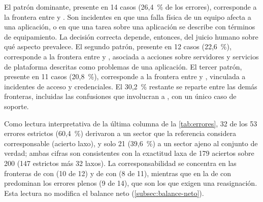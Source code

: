 El patrón dominante, presente en 14 casos (26,4~\% de los errores), corresponde a la frontera entre  y . Son incidentes en que una falla física de un equipo afecta a una aplicación, o en que una tarea sobre una aplicación se describe con términos de equipamiento. La decisión correcta depende, entonces, del juicio humano sobre qué aspecto prevalece. El segundo patrón, presente en 12 casos (22,6~\%), corresponde a la frontera entre  y , asociada a acciones sobre servidores y servicios de plataforma descritas como problemas de una aplicación. El tercer patrón, presente en 11 casos (20,8~\%), corresponde a la frontera entre  y , vinculada a incidentes de acceso y credenciales. El 30,2~\% restante se reparte entre las demás fronteras, incluidas las confusiones que involucran a , con un único caso de soporte.

Como lectura interpretativa de la última columna de la \autoref{tab:errores}, 32 de los 53 errores estrictos (60,4~\%) derivaron a un sector que la referencia considera corresponsable (acierto laxo), y solo 21 (39,6~\%) a un sector ajeno al conjunto de verdad; ambas cifras son consistentes con la exactitud laxa de 179 aciertos sobre 200 (147 estrictos más 32 laxos). La corresponsabilidad se concentra en las fronteras de  con  (10 de 12) y de  con  (8 de 11), mientras que en la de  con  predominan los errores plenos (9 de 14), que son los que exigen una reasignación. Esta lectura no modifica el balance neto (\autoref{subsec:balance-neto}).

